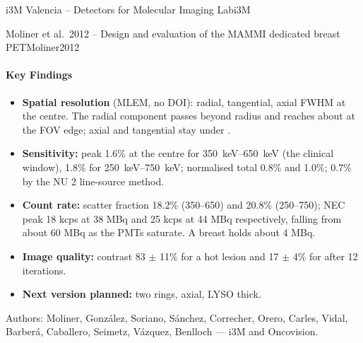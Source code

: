 \begin{programnote}{i3M Valencia -- Detectors for Molecular Imaging Lab}{i3M}
\begin{papernote}{Moliner et al.\ 2012 -- Design and evaluation of the MAMMI dedicated breast PET}{Moliner2012}
\paragraph{Key Findings}
\begin{itemize}
	\item \textbf{Spatial resolution} (MLEM, no DOI):  radial,
		 tangential,  axial FWHM at the centre. The radial
		component passes  beyond  radius and reaches about
		 at the FOV edge; axial and tangential stay under .
	\item \textbf{Sensitivity:} peak 1.6\% at the centre for
		\qtyrange{350}{650}{\kilo\electronvolt} (the clinical window), 1.8\%
		for \qtyrange{250}{750}{\kilo\electronvolt}; normalised total 0.8\% and
		1.0\%; 0.7\% by the NU 2 line-source method.
	\item \textbf{Count rate:} scatter fraction 18.2\% (350--650) and 20.8\%
		(250--750); NEC peak 18 kcps at 38 MBq and 25 kcps at 44 MBq
		respectively, falling from about 60 MBq as the PMTs saturate. A
		breast holds about 4 MBq.
	\item \textbf{Image quality:} contrast 83 $\pm$ 11\% for a 
		hot lesion and 17 $\pm$ 4\% for  after 12 iterations.
	\item \textbf{Next version planned:} two rings,  axial, LYSO
		 thick.
\end{itemize}
Authors: Moliner, González, Soriano, Sánchez, Correcher, Orero, Carles, Vidal,
Barberá, Caballero, Seimetz, Vázquez, Benlloch --- i3M and Oncovision.


\end{papernote}
\end{programnote}
